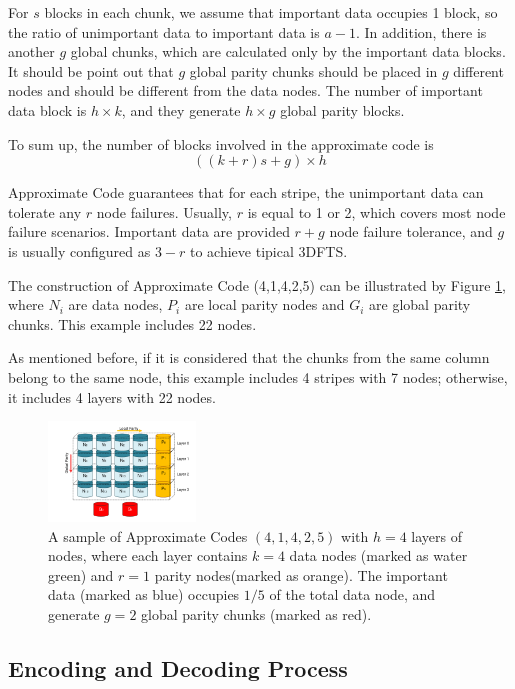 \documentclass[sigconf]{acmart}
\begin{document}
For $s$ blocks in each chunk, we assume that important data occupies 1 block, so the ratio of unimportant data to important data is $a-1$.
In addition, there is another $g$ global chunks, which are calculated only by the important data blocks. It should be point out that $g$ global parity chunks should be placed in $g$ different nodes and should be different from the data nodes. 
The number of important data block is $h \times k$, and they generate $h \times g$ global parity blocks.

To sum up, the number of blocks involved in the approximate code is 
$$((k+r)s + g) \times h$$

Approximate Code guarantees that for each stripe, the unimportant data can tolerate any $r$ node failures. Usually, $r$ is equal to 1 or 2, which covers most node failure scenarios. Important data are provided $r+g$ node failure tolerance, and $g$ is usually configured as $3-r$ to achieve tipical 3DFTS.

The construction of Approximate Code (4,1,4,2,5) can be illustrated by Figure \ref{fig-ap-41425}, where $N_i$ are data nodes, $P_{i}$ are local parity nodes and $G_i$ are global parity chunks. 
This example includes 22 nodes. 

As mentioned before, if it is considered that the chunks from the same column belong to the same node, this example includes 4 stripes with 7 nodes; otherwise, it includes 4 layers with 22 nodes.

\begin{figure}[h]
\centering
\includegraphics[width=0.35\textwidth]{photo/AP-kmha-v5.pdf}
\caption{A sample of Approximate Codes $(4,1,4,2,5)$ with $h=4$ layers of nodes, where each layer contains $k=4$ data nodes (marked as water green) and $r=1$ parity nodes(marked as orange).
The important data (marked as blue) occupies $1/5$ of the total data node, and generate $g=2$ global parity chunks (marked as red).}
\label{fig-ap-41425}
\end{figure}

\iffalse
\subsection{Encoding and Decoding Process}
\end{document}
